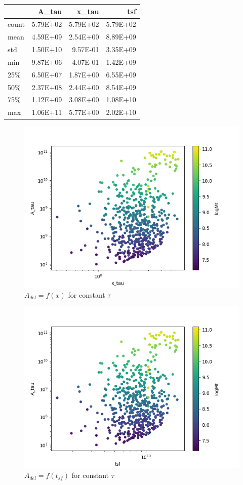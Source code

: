 \documentclass[a4paper,twocolumn]{article}
\begin{document}
\begin{table}[hc]
\centering
\begin{tabular}{lrrr}
\toprule
{} &    A\_tau &    x\_tau &      tsf \\
\midrule
count & 5.79E+02 & 5.79E+02 & 5.79E+02 \\
mean  & 4.59E+09 & 2.54E+00 & 8.89E+09 \\
std   & 1.50E+10 & 9.57E-01 & 3.35E+09 \\
min   & 9.87E+06 & 4.07E-01 & 1.42E+09 \\
25\%   & 6.50E+07 & 1.87E+00 & 6.55E+09 \\
50\%   & 2.37E+08 & 2.44E+00 & 8.54E+09 \\
75\%   & 1.12E+09 & 3.08E+00 & 1.08E+10 \\
max   & 1.06E+11 & 5.77E+00 & 2.02E+10 \\
\bottomrule
\end{tabular}
\end{table}

\begin{figure}[!htpb]
\centering
\includegraphics[width=.9\linewidth]{./figs/x-A_tau.png}
\caption{\label{fig:$A_{del} = f(x)$ for constant $\tau$}\(A_{del} = f(x)\) for constant \(\tau\)}
\end{figure}


\begin{figure}[!htpb]
\centering
\includegraphics[width=.9\linewidth]{./figs/T-A_tau.png}
\caption{\label{fig:$A_{del} = f(t_{sf})$ for constant $\tau$}\(A_{del} = f(t_{sf})\) for constant \(\tau\)}
\end{figure}
\end{document}
